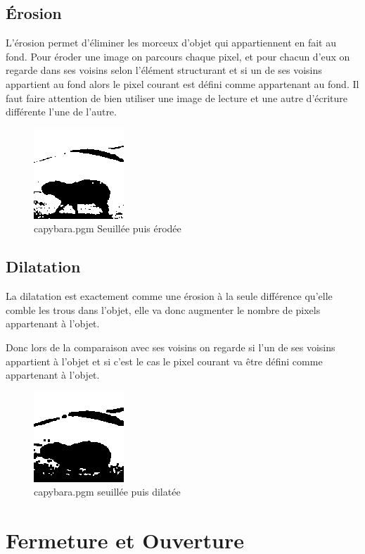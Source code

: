 \documentclass{article}
\begin{document}
\subsection{Érosion}

L'érosion permet d'éliminer les morceux d'objet qui appartiennent en fait au fond.
Pour éroder une image on parcours chaque pixel, et pour chacun d'eux on regarde dans ses voisins selon l'élément structurant et si un de ses voisins appartient au fond alors le pixel courant est défini comme appartenant au fond.
Il faut faire attention de bien utiliser une image de lecture et une autre d'écriture différente l'une de l'autre.

\begin{figure}[h]
\centerline{\includegraphics[scale=1.4]{./rendus/capybatapEro.png}}
\caption{capybara.pgm Seuillée puis érodée}
\end{figure}

\subsection{Dilatation}
La dilatation est exactement comme une érosion à la seule différence qu'elle comble les trous dans l'objet, elle va donc augmenter le nombre de pixels appartenant à l'objet.

Donc lors de la comparaison avec ses voisins on regarde si l'un de ses voisins appartient à l'objet et si c'est le cas le pixel courant va être défini comme appartenant à l'objet.


\begin{figure}[h]
\centerline{\includegraphics[scale=1.4]{./rendus/capybatapDila.png}}
\caption{capybara.pgm seuillée puis dilatée}
\end{figure}

\newpage
\section{Fermeture et Ouverture}
\end{document}
